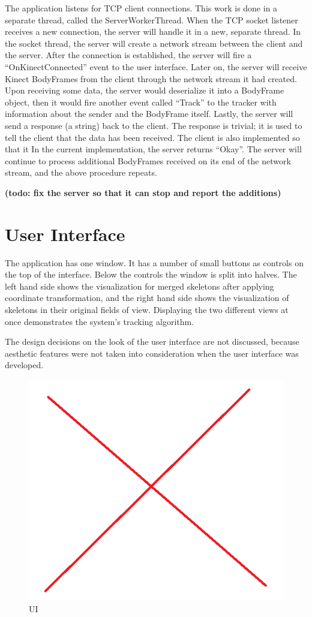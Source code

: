 The application listens for TCP client connections. This work is done in a separate thread, called the ServerWorkerThread. When the TCP socket listener receives a new connection, the server will handle it in a new, separate thread. In the socket thread, the server will create a network stream between the client and the server. After the connection is established, the server will fire a ``OnKinectConnected'' event to the user interface. Later on, the server will receive Kinect BodyFrames from the client through the network stream it had created. Upon receiving some data, the server would deserialize it into a BodyFrame object, then it would fire another event called ``Track'' to the tracker with information about the sender and the BodyFrame itself. Lastly, the server will send a response (a string) back to the client. The response is trivial; it is used to tell the client that the data has been received. The client is also implemented so that it In the current implementation, the server returns ``Okay''. The server will continue to process additional BodyFrames received on its end of the network stream, and the above procedure repeats.

\textbf{(todo: fix the server so that it can stop and report the additions)}

\section{User Interface}
\label{sec:implementation_ui}

The application has one window. It has a number of small buttons as controls on the top of the interface. Below the controls the window is split into halves. The left hand side shows the visualization for merged skeletons after applying coordinate transformation, and the right hand side shows the visualization of skeletons in their original fields of view. Displaying the two different views at once demonstrates the system's tracking algorithm.

The design decisions on the look of the user interface are not discussed, because aesthetic features were not taken into consideration when the user interface was developed.

\begin{figure}[!h]
  \centering
  \includegraphics[width=0.5\linewidth]{figs/ui}
  \caption{UI}
  \label{fig:ui}
\end{figure}

